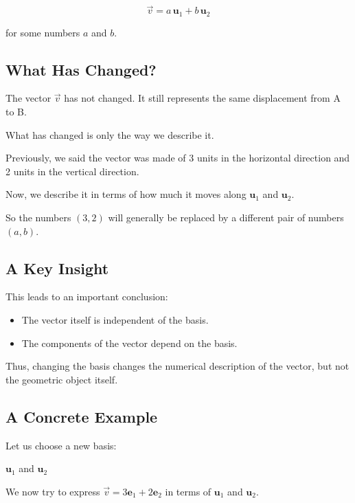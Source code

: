 \documentclass[11pt,openany]{book}
\theoremstyle{definition}
\begin{document}
\[
\vec{v} = a\,\mathbf{u}_1 + b\,\mathbf{u}_2
\]

for some numbers $a$ and $b$.

\medskip

\subsection{What Has Changed?}

The vector $\vec{v}$ has not changed. 
It still represents the same displacement from A to B.

What has changed is only the way we describe it.

Previously, we said the vector was made of 3 units in the horizontal direction and 2 units in the vertical direction.

Now, we describe it in terms of how much it moves along $\mathbf{u}_1$ and $\mathbf{u}_2$.

So the numbers $(3,2)$ will generally be replaced by a different pair of numbers $(a,b)$.

\medskip

\subsection{A Key Insight}

This leads to an important conclusion:

\begin{itemize}
  \item The vector itself is independent of the basis.
  \item The components of the vector depend on the basis.
\end{itemize}

Thus, changing the basis changes the numerical description of the vector, 
but not the geometric object itself.


\subsection{A Concrete Example}

Let us choose a new basis:

$\mathbf{u}_1$ and $\mathbf{u}_2$


We now try to express $\vec{v} = 3\mathbf{e}_1 + 2\mathbf{e}_2$ in terms of $\mathbf{u}_1$ and $\mathbf{u}_2$.
\end{document}
